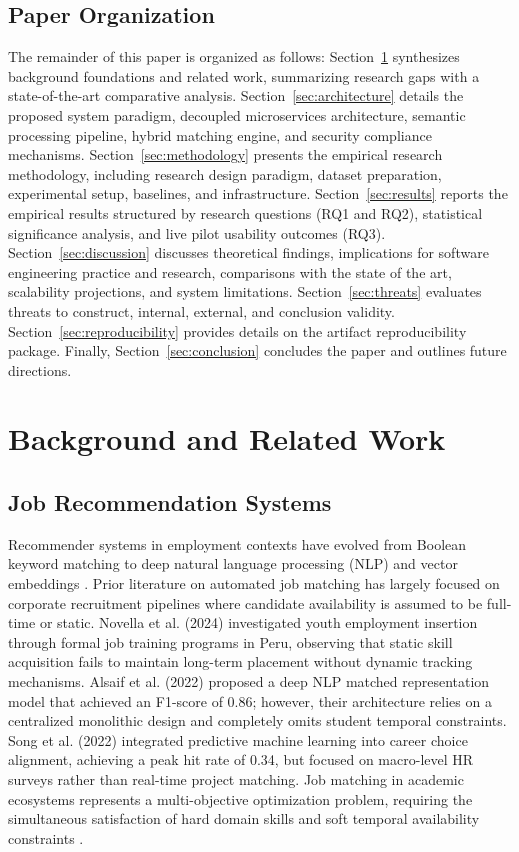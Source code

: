 \documentclass[a4paper,fleqn]{cas-dc}
\begin{document}
\subsection{Paper Organization}
The remainder of this paper is organized as follows: Section~\ref{sec:related} synthesizes background foundations and related work, summarizing research gaps with a state-of-the-art comparative analysis. Section~\ref{sec:architecture} details the proposed system paradigm, decoupled microservices architecture, semantic processing pipeline, hybrid matching engine, and security compliance mechanisms. Section~\ref{sec:methodology} presents the empirical research methodology, including research design paradigm, dataset preparation, experimental setup, baselines, and infrastructure. Section~\ref{sec:results} reports the empirical results structured by research questions (RQ1 and RQ2), statistical significance analysis, and live pilot usability outcomes (RQ3). Section~\ref{sec:discussion} discusses theoretical findings, implications for software engineering practice and research, comparisons with the state of the art, scalability projections, and system limitations. Section~\ref{sec:threats} evaluates threats to construct, internal, external, and conclusion validity. Section~\ref{sec:reproducibility} provides details on the artifact reproducibility package. Finally, Section~\ref{sec:conclusion} concludes the paper and outlines future directions.

\section{Background and Related Work}
\label{sec:related}

\subsection{Job Recommendation Systems}
Recommender systems in employment contexts have evolved from Boolean keyword matching to deep natural language processing (NLP) and vector embeddings \cite{alsaif2022, ertugrul2025}. Prior literature on automated job matching has largely focused on corporate recruitment pipelines where candidate availability is assumed to be full-time or static. Novella et al. (2024) \cite{novella2024} investigated youth employment insertion through formal job training programs in Peru, observing that static skill acquisition fails to maintain long-term placement without dynamic tracking mechanisms. Alsaif et al. (2022) \cite{alsaif2022} proposed a deep NLP matched representation model that achieved an F1-score of 0.86; however, their architecture relies on a centralized monolithic design and completely omits student temporal constraints. Song et al. (2022) \cite{song2022} integrated predictive machine learning into career choice alignment, achieving a peak hit rate of 0.34, but focused on macro-level HR surveys rather than real-time project matching. Job matching in academic ecosystems represents a multi-objective optimization problem, requiring the simultaneous satisfaction of hard domain skills and soft temporal availability constraints \cite{song2022, rebaza2025, gadegaonkar2023}.
\end{document}

